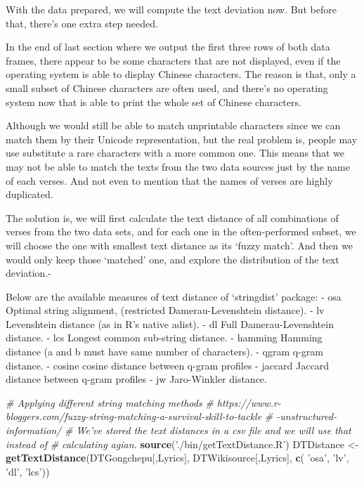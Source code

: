 \documentclass[]{article}
\newenvironment{Shaded}{\begin{snugshade}}{\end{snugshade}}
\newcommand{\CommentTok}[1]{\textcolor[rgb]{0.56,0.35,0.01}{\textit{#1}}}
\newcommand{\KeywordTok}[1]{\textcolor[rgb]{0.13,0.29,0.53}{\textbf{#1}}}
\newcommand{\NormalTok}[1]{#1}
\newcommand{\StringTok}[1]{\textcolor[rgb]{0.31,0.60,0.02}{#1}}
\begin{document}
With the data prepared, we will compute the text deviation now. But
before that, there's one extra step needed.

In the end of last section where we output the first three rows of both
data frames, there appear to be some characters that are not displayed,
even if the operating system is able to display Chinese characters. The
reason is that, only a small subset of Chinese characters are often
used, and there's no operating system now that is able to print the
whole set of Chinese characters.

Although we would still be able to match unprintable characters since we
can match them by their Unicode representation, but the real problem is,
people may use substitute a rare characters with a more common one. This
means that we may not be able to match the texts from the two data
sources just by the name of each verses. And not even to mention that
the names of verses are highly duplicated.

The solution is, we will first calculate the text distance of all
combinations of verses from the two data sets, and for each one in the
often-performed subset, we will choose the one with smallest text
distance as its `fuzzy match'. And then we would only keep those
`matched' one, and explore the distribution of the text deviation.-

Below are the available measures of text distance of `stringdist'
package: - osa Optimal string alignment, (restricted Damerau-Levenshtein
distance). - lv Levenshtein distance (as in R's native adist). - dl Full
Damerau-Levenshtein distance. - lcs Longest common sub-string distance.
- hamming Hamming distance (a and b must have same number of
characters). - qgram q-gram distance. - cosine cosine distance between
q-gram profiles - jaccard Jaccard distance between q-gram profiles - jw
Jaro-Winkler distance.

\begin{Shaded}
\begin{Highlighting}[]
\CommentTok{# Applying different string matching methods}
\CommentTok{# https://www.r-bloggers.com/fuzzy-string-matching-a-survival-skill-to-tackle}
\CommentTok{# -unstructured-information/}
\CommentTok{# We've stored the text distances in a csv file and we will use that instead of}
\CommentTok{# calculating agian.}
\KeywordTok{source}\NormalTok{(}\StringTok{'./bin/getTextDistance.R'}\NormalTok{)}
\NormalTok{DTDistance <-}
\StringTok{  }\KeywordTok{getTextDistance}\NormalTok{(DTGongchepu[,Lyrics],}
\NormalTok{                  DTWikisource[,Lyrics],}
                  \KeywordTok{c}\NormalTok{( }\StringTok{'osa'}\NormalTok{, }\StringTok{'lv'}\NormalTok{, }\StringTok{'dl'}\NormalTok{, }\StringTok{'lcs'}\NormalTok{))}
\end{Highlighting}
\end{Shaded}
\end{document}

